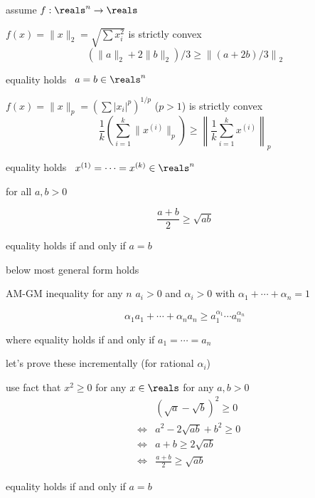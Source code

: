 \documentclass[17pt,landscape]{foils}
\begin{document}
{

\bit
	\item assume $f:\reals^n\to\reals$

	\vitem $f(x)=\|x\|_2 = \sqrt{\sum x_i^2}$ is strictly convex
	\[
		(\|a\|_2 + 2\|b\|_2 )/3
		\geq
		\left\|(a+2b)/3\right\|_2
	\]
	\bit
		\item equality holds \iaoi\ $a=b\in\reals^n$
	\eit

	\vitem $f(x)=\|x\|_p = \left(\sum |x_i|^p\right)^{1/p}$ ($p>1$) is strictly convex
	\[
		\frac{1}{k}
		\left(\sum_{i=1}^k\|x^{(i)}\|_p \right)
		\geq
		\left\|\frac{1}{k}\sum_{i=1}^k x^{(i)}\right\|_p
	\]
	\bit
		\item equality holds \iaoi\ $x^{(1)}=\cdots=x^{(k)}\in\reals^n$
	\eit
\eit



\bit
\item
	for all $a,b>0$

	\[
		\frac{a + b}{2} \geq \sqrt{ab}
	\]
	\bit
	\item
		equality holds if and only if $a=b$
	\eit

\vitem
	below most general form holds
\eit

\begin{myinequality}{AM-GM inequality}
	for any $n$ $a_i>0$ and $\alpha_i>0$ with $\alpha_1+\cdots+\alpha_n=1$

	\[
		\alpha_1 a_1 + \cdots + \alpha_n a_n
		\geq
		{a_1^{\alpha_1} \cdots a_n^{\alpha_n}}
	\]

	where equality holds if and only if $a_1=\cdots=a_n$
\end{myinequality}

\bit
\item
	let's prove these incrementally
	(for rational $\alpha_i$)
\eit
\vfill



\bit
	\item use fact that $x^2\geq0$ for any $x\in\reals$
	\vitem for any $a,b>0$
		\begin{eqnarray*}
		&&
			(\sqrt{a}-\sqrt{b})^2 \geq 0
		\\
		&\Leftrightarrow&
			a^2 - 2\sqrt{ab} + b^2 \geq 0
		\\
		&\Leftrightarrow&
			a + b \geq 2\sqrt{ab}
		\\
		&\Leftrightarrow&
			\frac{a + b}{2} \geq \sqrt{ab}
		\end{eqnarray*}
		\bit
			\item equality holds if and only if $a=b$
		\eit
\eit


}
\end{document}
